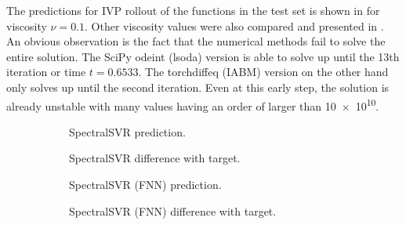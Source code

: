 \documentclass[preprint,12pt,times,authoryear]{elsarticle}
\begin{document}
The predictions for IVP rollout of the functions in the test set is shown in  for viscosity \(\nu=0.1\). Other viscosity values were also compared and presented in . An obvious observation is the fact that the numerical methods fail to solve the entire solution. The SciPy odeint (lsoda) version is able to solve up until the 13th iteration or time \(t=0.6533\). The torchdiffeq (IABM) version on the other hand only solves up until the second iteration. Even at this early step, the solution is already unstable with many values having an order of larger than \num{10e10}.
\begin{figure}[H]
  \centering
  \begin{adjustwidth}{-0.05\linewidth}{-0.05\linewidth}
    \begin{subfigure}{0.49\linewidth}
      \begin{adjustbox}{width=\linewidth}
        
      \end{adjustbox}
      \caption{SpectralSVR prediction.}\label{fig:comp_lssvr_pred_0.1}
    \end{subfigure}
    \begin{subfigure}{0.49\linewidth}
      \begin{adjustbox}{width=\linewidth}
        
      \end{adjustbox}
      \caption{SpectralSVR difference with target.}\label{fig:comp_lssvr_diff_0.1}
    \end{subfigure}
    \begin{subfigure}{0.49\linewidth}
      \begin{adjustbox}{width=\linewidth}
        
      \end{adjustbox}
      \caption{SpectralSVR (FNN) prediction.}\label{fig:comp_fnn_pred_0.1}
    \end{subfigure}
    \begin{subfigure}{0.49\linewidth}
      \begin{adjustbox}{width=\linewidth}
        
      \end{adjustbox}
      \caption{SpectralSVR (FNN) difference with target.}\label{fig:comp_fnn_diff_0.1}
    \end{subfigure}
    \begin{subfigure}{0.49\linewidth}

\end{subfigure}
\end{adjustwidth}
\end{figure}
\end{document}
